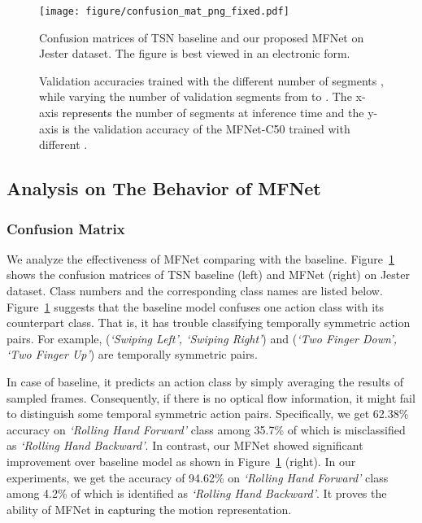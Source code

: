 \documentclass[runningheads]{llncs}
\newcommand{\nj}[1]{\textcolor{black}{#1}}
\begin{document}
\begin{figure}[t]
\centering
\texttt{[image: figure/confusion\_mat\_png\_fixed.pdf]}
\caption{Confusion matrices of TSN baseline and our proposed MFNet on Jester dataset. The figure is best viewed in an electronic form.} 
\label{confusion}
\end{figure}


\begin{figure}[tb]
\centering
\begin{minipage}[t]{0.45\linewidth}
    \label{f3}
\end{minipage}
\begin{minipage}[t]{0.45\linewidth}
    \label{f4}
\end{minipage}
\caption{Validation accuracies trained with the different number of segments , while varying the number of validation segments from  to . The x-axis \nj{represents} the number of segments at inference time and the y-axis \nj{is} the validation accuracy of the MFNet-C50 trained with different .}
\label{figure:varying_inference}
\end{figure}

\subsection{Analysis on The Behavior of MFNet}
\subsubsection{Confusion Matrix}
We analyze the effectiveness of MFNet comparing with the baseline. Figure~\ref{confusion} shows the confusion matrices of TSN baseline (left) and MFNet (right) on Jester dataset. Class numbers and the corresponding class names are listed below. Figure~\ref{confusion} suggests that the baseline model confuses one action class with its counterpart class. That is, it has trouble classifying temporally symmetric action pairs. For example, (\textit{`Swiping Left', `Swiping Right'}) and (\textit{`Two Finger Down', `Two Finger Up'}) are temporally symmetric pairs. 

In case of baseline, it predicts an action class by simply averaging the results of sampled frames. Consequently, if there is no optical flow information, it might fail to distinguish some temporal symmetric action pairs. Specifically, we get 62.38\% accuracy on \textit{`Rolling Hand Forward'} class among 35.7\% of which is misclassified as \textit{`Rolling Hand Backward'}. 
In contrast, our MFNet showed significant improvement over baseline model as shown in Figure~\ref{confusion} (right). In our experiments, we get the accuracy of 94.62\% on \textit{`Rolling Hand Forward'} class among 4.2\% of which is identified as \textit{`Rolling Hand Backward'}. It proves the ability of MFNet \nj{in capturing} the motion representation.
\end{document}
